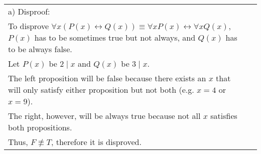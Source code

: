 \documentclass[12pt]{exam}
\begin{document}
\begin{solution}
\begin{tabular}{ll}
 a) Disproof:\\
 To disprove $\forall x(P(x) \leftrightarrow Q(x)) \equiv \forall x P(x) \leftrightarrow \forall x Q(x)$, $P(x)$ has to be sometimes true but not always, and $Q(x)$ has to be always false.\\
 Let $P(x)$ be $2 \mid x$ and $Q(x)$ be $3 \mid x$.\\
 The left proposition will be false because there exists an $x$ that will only satisfy either proposition but not both (e.g. $x=4$ or $x=9$).\\
 The right, however, will be always true because not all $x$ satisfies both propositions.\\
 Thus, $F \not \equiv T$, therefore it is disproved.\\
\end{tabular}
\end{solution}
\end{document}
